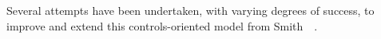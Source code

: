 Several attempts have been undertaken, with varying degrees of success, to improve and extend this
controls-oriented model from Smith~\etal{}~\cite{Smith2007}.









